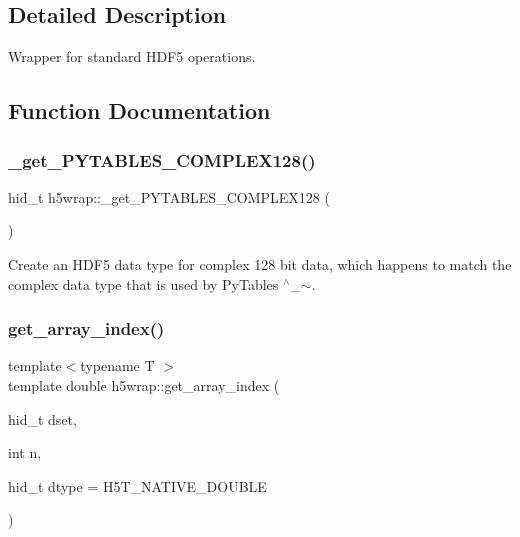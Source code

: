 \subsection{Detailed Description}
Wrapper for standard H\+D\+F5 operations. 

\subsection{Function Documentation}
\mbox{\label{namespaceh5wrap_a2ddc38d8445aba6996a31fc0dde6b7bf}} 
\subsubsection{\texorpdfstring{\+\_\+get\+\_\+\+P\+Y\+T\+A\+B\+L\+E\+S\+\_\+\+C\+O\+M\+P\+L\+E\+X128()}{\_get\_PYTABLES\_COMPLEX128()}}
{\footnotesize\ttfamily hid\+\_\+t h5wrap\+::\+\_\+get\+\_\+\+P\+Y\+T\+A\+B\+L\+E\+S\+\_\+\+C\+O\+M\+P\+L\+E\+X128 (\begin{DoxyParamCaption}{ }\end{DoxyParamCaption})\hspace{0.3cm}{\ttfamily [inline]}}

Create an H\+D\+F5 data type for complex 128 bit data, which happens to match the complex data type that is used by Py\+Tables $^\wedge$\+\_\+$\sim$. \mbox{\label{namespaceh5wrap_aa1fe2dffc1fcbde11e7ceaf3fcc57cfd}} 
\subsubsection{\texorpdfstring{get\+\_\+array\+\_\+index()}{get\_array\_index()}}
{\footnotesize\ttfamily template$<$typename T $>$ \\
template double h5wrap\+::get\+\_\+array\+\_\+index (\begin{DoxyParamCaption}\item[{hid\+\_\+t}]{dset,  }\item[{int}]{n,  }\item[{hid\+\_\+t}]{dtype = {\ttfamily H5T\+\_\+NATIVE\+\_\+DOUBLE} }\end{DoxyParamCaption})}

